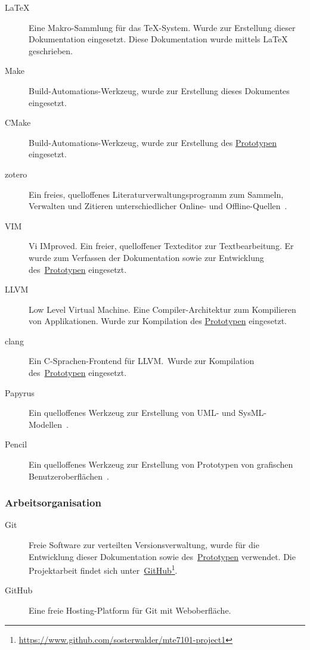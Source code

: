 \begin{description}
    \item[\LaTeX] Eine Makro-Sammlung für das \TeX-System. Wurde zur
        Erstellung dieser Dokumentation eingesetzt. Diese Dokumentation
        wurde mittels \LaTeX{} geschrieben.
    \item[Make] Build-Automations-Werkzeug, wurde zur Erstellung dieses Dokumentes eingesetzt.
    \item[CMake] Build-Automations-Werkzeug, wurde zur Erstellung des
        \hyperref[chap:prototype]{Prototypen} eingesetzt.
    \item[zotero] Ein freies, quelloffenes Literaturverwaltungsprogramm
        zum Sammeln, Verwalten und Zitieren unterschiedlicher Online-
        und Offline-Quellen~\parencite{wikipedia_foundation_zotero_2015}.
    \item[VIM] Vi IMproved. Ein freier, quelloffener Texteditor zur
        Textbearbeitung. Er wurde zum Verfassen der Dokumentation sowie zur
        Entwicklung des~\hyperref[chap:prototype]{Prototypen} eingesetzt.
    \item[LLVM] Low Level Virtual Machine. Eine Compiler-Architektur zum
        Kompilieren von Applikationen. Wurde zur Kompilation des
        \hyperref[chap:prototype]{Prototypen} eingesetzt.
    \item[clang] Ein C-Sprachen-Frontend für LLVM.\ Wurde zur Kompilation
        des~\hyperref[chap:prototype]{Prototypen} eingesetzt.
    \item[Papyrus] Ein quelloffenes Werkzeug zur Erstellung von UML- und
        SysML-Modellen~\parencite{the_ecllipse_foundation_papyris_2015}.
    \item[Pencil] Ein quelloffenes Werkzeug zur Erstellung von Prototypen von
        grafischen Benutzeroberflächen~\parencite{evolus_pencil_2015}.
\end{description}


\subsubsection{Arbeitsorganisation}
\label{ssubsec:tools_software:job_organisation}

\begin{description}
    \item[Git] Freie Software zur verteilten Versionsverwaltung, wurde
        für die Entwicklung dieser Dokumentation sowie
        des~\hyperref[chap:prototype]{Prototypen} verwendet. Die
        Projektarbeit findet sich
        unter~\href{https://www.github.com/sosterwalder/mte7101-project1}{GitHub}\footnote{
        \href{https://www.github.com/sosterwalder/mte7101-project1}{https://www.github.com/sosterwalder/mte7101-project1}
    }.
    \item[GitHub] Eine freie Hosting-Platform für Git mit Weboberfläche.
\end{description}

